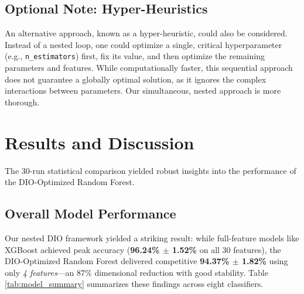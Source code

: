 \documentclass[12pt, a4paper]{article}
\begin{document}
\subsection{Optional Note: Hyper-Heuristics}
An alternative approach, known as a hyper-heuristic, could also be considered. Instead of a nested loop, one could optimize a single, critical hyperparameter (e.g., \texttt{n\_estimators}) first, fix its value, and then optimize the remaining parameters and features. While computationally faster, this sequential approach does not guarantee a globally optimal solution, as it ignores the complex interactions between parameters. Our simultaneous, nested approach is more thorough.

\section{Results and Discussion}

The 30-run statistical comparison yielded robust insights into the performance of the DIO-Optimized Random Forest.

\subsection{Overall Model Performance}
Our nested DIO framework yielded a striking result: while full-feature models like XGBoost achieved peak accuracy (\textbf{96.24\% $\pm$ 1.52\%} on all 30 features), the DIO-Optimized Random Forest delivered competitive \textbf{94.37\% $\pm$ 1.82\%} using only \textit{4 features}—an 87\% dimensional reduction with good stability. Table \ref{tab:model_summary} summarizes these findings across eight classifiers.

\begin{table}[H]
    \centering
    \caption{Model Performance Summary over 30 Runs - RF Single-Split Approach (Top 5 and DIO)}
    \label{tab:model_summary}
\end{table}
\end{document}
